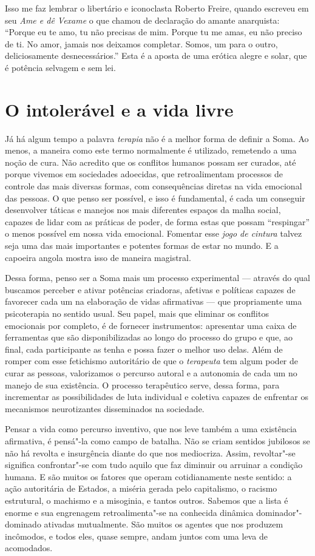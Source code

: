 Isso me faz lembrar o libertário e iconoclasta Roberto Freire, quando
escreveu em seu \emph{Ame e dê Vexame} o que chamou de declaração do amante
anarquista: ``Porque eu te amo, tu não precisas de mim. Porque tu me
amas, eu não preciso de ti. No amor, jamais nos deixamos completar.
Somos, um para o outro, deliciosamente desnecessários.'' Esta é a aposta
de uma erótica alegre e solar, que é potência selvagem e sem lei.

\section{O intolerável e a vida livre}

Já há algum tempo a palavra \emph{terapia} não é a melhor forma de
definir a Soma. Ao menos, a maneira como este termo normalmente é
utilizado, remetendo a uma noção de cura. Não acredito que os conflitos
humanos possam ser curados, até porque vivemos em sociedades adoecidas,
que retroalimentam processos de controle das mais diversas formas, com
consequências diretas na vida emocional das pessoas. O que penso ser
possível, e isso é fundamental, é cada um conseguir desenvolver táticas
e manejos nos mais diferentes espaços da malha social, capazes de lidar
com as práticas de poder, de forma estas que possam ``respingar'' o
menos possível em nossa vida emocional. Fomentar esse \emph{jogo de
cintura} talvez seja uma das mais importantes e potentes formas de estar
no mundo. E a capoeira angola mostra isso de maneira magistral.

Dessa forma, penso ser a Soma mais um processo experimental --- através do
qual buscamos perceber e ativar potências criadoras, afetivas e
políticas capazes de favorecer cada um na elaboração de vidas
afirmativas --- que propriamente uma psicoterapia no sentido usual. Seu
papel, mais que eliminar os conflitos emocionais por completo, é de
fornecer instrumentos: apresentar uma caixa de ferramentas que são
disponibilizadas ao longo do processo do grupo e que, ao final, cada
participante as tenha e possa fazer o melhor uso delas. Além de romper
com esse fetichismo autoritário de que o \emph{terapeuta} tem algum
poder de curar as pessoas, valorizamos o percurso autoral e a autonomia
de cada um no manejo de sua existência. O processo terapêutico serve,
dessa forma, para incrementar as possibilidades de luta individual e
coletiva capazes de enfrentar os mecanismos neurotizantes disseminados na
sociedade.

Pensar a vida como percurso inventivo, que nos leve também a uma
existência afirmativa, é pensá"-la como campo de batalha. Não se criam
sentidos jubilosos se não há revolta e insurgência diante do que nos
mediocriza. Assim, revoltar"-se significa confrontar"-se com tudo aquilo
que faz diminuir ou arruinar a condição humana. E são muitos os
fatores que operam cotidianamente neste sentido: a ação autoritária de
Estados, a miséria gerada pelo capitalismo, o racismo estrutural, o
machismo e a misoginia, e tantos outros. Sabemos que a lista é enorme e
sua engrenagem retroalimenta"-se na conhecida dinâmica dominador"-dominado
ativadas mutualmente. São muitos os agentes que nos produzem incômodos,
e todos eles, quase sempre, andam juntos com uma leva de acomodados.

